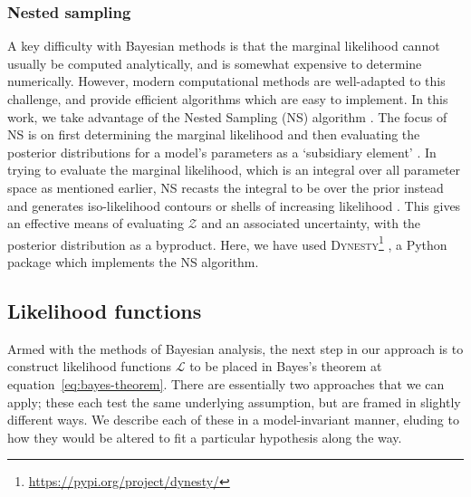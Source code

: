 \documentclass[fleqn,usenatbib]{mnras}
\begin{document}
        \subsubsection{Nested sampling}
            \label{subs:nested-sampling}
            A key difficulty with Bayesian methods is that the marginal likelihood cannot usually be computed analytically, and is somewhat expensive to determine numerically.
            However, modern computational methods are well-adapted to this challenge, and provide efficient algorithms which are easy to implement.
            In this work, we take advantage of the Nested Sampling (NS) algorithm \citep{skilling2004, skilling2006}.
            The focus of NS is on first determining the marginal likelihood and then evaluating the posterior distributions for a model's parameters as a `subsidiary element' \citep{skilling2004}.
            In trying to evaluate the marginal likelihood, which is an integral over all parameter space as mentioned earlier, NS recasts the integral to be over the prior instead and generates iso-likelihood contours or shells of increasing likelihood \citep{speagle2020}.
            This gives an effective means of evaluating $\mathcal{Z}$ and an associated uncertainty, with the posterior distribution as a byproduct.
            Here, we have used \textsc{Dynesty}\footnote{\url{https://pypi.org/project/dynesty/}} \citep{dynesty-v2.1.2}, a Python package which implements the NS algorithm.
        

        \subsection{Likelihood functions}
        \label{sub:likelihood-functions}
            Armed with the methods of Bayesian analysis, the next step in our approach is to construct likelihood functions $\mathcal{L}$ to be placed in Bayes's theorem at equation~\eqref{eq:bayes-theorem}.
            There are essentially two approaches that we can apply; these each test the same underlying assumption, but are framed in slightly different ways.
            We describe each of these in a model-invariant manner, eluding to how they would be altered to fit a particular hypothesis along the way.
\end{document}

